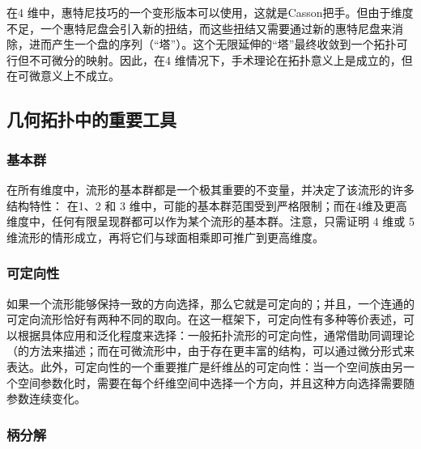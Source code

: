 在4 维中，惠特尼技巧的一个变形版本可以使用，这就是Casson把手。但由于维度不足，一个惠特尼盘会引入新的扭结，而这些扭结又需要通过新的惠特尼盘来消除，进而产生一个盘的序列（“塔”）。这个无限延伸的“塔”最终收敛到一个拓扑可行但不可微分的映射。因此，在4 维情况下，手术理论在拓扑意义上是成立的，但在可微意义上不成立。
\subsection{几何拓扑中的重要工具}
\subsubsection{基本群}
在所有维度中，流形的基本群都是一个极其重要的不变量，并决定了该流形的许多结构特性：
在1、2 和 3 维中，可能的基本群范围受到严格限制；而在4维及更高维度中，任何有限呈现群都可以作为某个流形的基本群。注意，只需证明 4 维或 5 维流形的情形成立，再将它们与球面相乘即可推广到更高维度。
\subsubsection{可定向性}
如果一个流形能够保持一致的方向选择，那么它就是可定向的；并且，一个连通的可定向流形恰好有两种不同的取向。在这一框架下，可定向性有多种等价表述，可以根据具体应用和泛化程度来选择：一般拓扑流形的可定向性，通常借助同调理论（的方法来描述；而在可微流形中，由于存在更丰富的结构，可以通过微分形式来表达。此外，可定向性的一个重要推广是纤维丛的可定向性：当一个空间族由另一个空间参数化时，需要在每个纤维空间中选择一个方向，并且这种方向选择需要随参数连续变化。
\subsubsection{柄分解}
